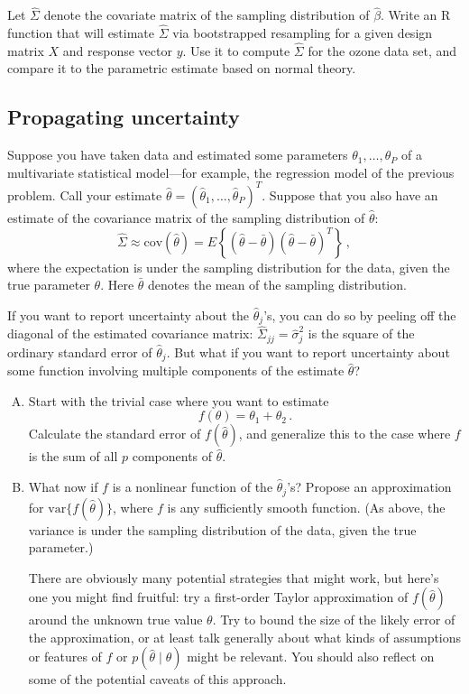 \documentclass{mynotes}
\newcommand{\thetahat}{\hat{\theta}}
\newcommand{\sigmahat}{\hat{\sigma}}
\begin{document}
Let $\hat{\Sigma}$ denote the covariate matrix of the sampling distribution of $\hat{\beta}$.  Write an R function that will estimate $\hat{\Sigma}$ via bootstrapped resampling for a given design matrix $X$ and response vector $y$.  Use it to compute $\hat{\Sigma}$ for the ozone data set, and compare it to the parametric estimate based on normal theory.

\subsection{Propagating uncertainty}

Suppose you have taken data and estimated some parameters $\theta_1, \ldots, \theta_P$ of a multivariate statistical model---for example, the regression model of the previous problem.  Call your estimate $\thetahat = (\thetahat_1, \ldots, \thetahat_P)^T$.  Suppose that you also have an estimate of the covariance matrix of the sampling distribution of $\thetahat$:
$$
\hat{\Sigma} \approx \mbox{cov}( \thetahat) = E \left\{ (\thetahat - \bar\theta) (\thetahat - \bar\theta)^T \right\} \, ,
$$
where the expectation is under the sampling distribution for the data, given the true parameter $\theta$.  Here $\bar\theta$ denotes the mean of the sampling distribution.

If you want to report uncertainty about the $\thetahat_j$'s, you can do so by peeling off the diagonal of the estimated covariance matrix: $\hat{\Sigma}_{jj} = \sigmahat^2_j$ is the square of the ordinary standard error of $\thetahat_j$.  But what if you want to report uncertainty about some function involving multiple components of the estimate $\thetahat$?

\begin{enumerate}[(A)]
\item Start with the trivial case where you want to estimate
$$
f(\theta) = \theta_1 + \theta_2 \, .
$$
Calculate the standard error of $f(\thetahat)$, and generalize this to the case where $f$ is the sum of all $p$ components of $\thetahat$.

\item What now if $f$ is a nonlinear function of the $\thetahat_j$'s?  Propose an approximation for $\mbox{var} \{ f(\thetahat) \}$, where $f$ is any sufficiently smooth function.  (As above, the variance is under the sampling distribution of the data, given the true parameter.)

There are obviously many potential strategies that might work, but here's one you might find fruitful: try a first-order Taylor approximation of $f(\thetahat)$ around the unknown true value $\theta$.  Try to bound the size of the likely error of the approximation, or at least talk generally about what kinds of assumptions or features of $f$ or $p(\thetahat \mid \theta)$ might be relevant.  You should also reflect on some of the potential caveats of this approach.

\end{enumerate}
\end{document}
